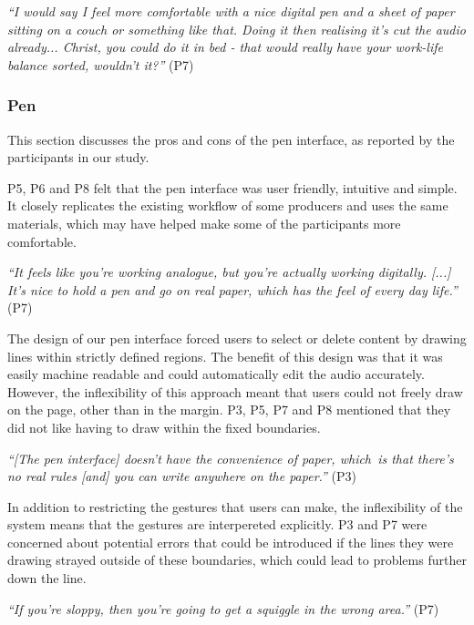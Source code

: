 \textit{``I would say I feel more comfortable with a nice digital pen and a sheet of paper sitting on a couch or
  something like that. Doing it then realising it's cut the audio already... Christ, you could do it in bed - that would
really have your work-life balance sorted, wouldn't it?''} (P7)

\subsubsection{Pen}

This section discusses the pros and cons of the pen interface, as reported by the participants in our study.


P5, P6 and P8 felt that the pen interface was user friendly, intuitive and simple. It closely replicates the existing
workflow of some producers and uses the same materials, which may have helped make some of the participants more
comfortable.

\textit{``It feels like you're working analogue, but you're actually working digitally. [...] It's nice to hold a pen
and go on real paper, which has the feel of every day life.''} (P7)


The design of our pen interface forced users to select or delete content by drawing lines within strictly defined
regions. The benefit of this design was that it was easily machine readable and could automatically edit the audio
accurately. However, the inflexibility of this approach meant that users could not freely draw on the page, other than
in the margin. P3, P5, P7 and P8 mentioned that they did not like having to draw within the fixed boundaries.

\textit{``[The pen interface] doesn't have the convenience of paper, which is that there's no real rules [and] you can
write anywhere on the paper.''} (P3)

In addition to restricting the gestures that users can make, the inflexibility of the system means that the gestures
are interpereted explicitly. P3 and P7 were concerned about potential errors that could be introduced if the lines they
were drawing strayed outside of these boundaries, which could lead to problems further down the line.

\textit{``If you're sloppy, then you're going to get a squiggle in the wrong area.''} (P7)

